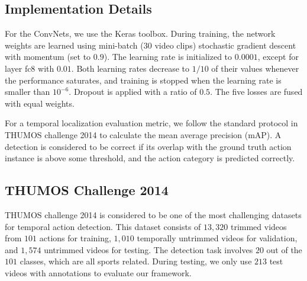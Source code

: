 \documentclass[10pt,twocolumn,letterpaper]{article}
\begin{document}
\subsection{Implementation Details}
For the ConvNets, we use the Keras toolbox.
During training, the network weights are learned using mini-batch ($30$ video clips) stochastic gradient descent with momentum (set to $0.9$). The learning rate is initialized to $0.0001$, except for layer \textsf{fc8} with $0.01$. Both learning rates decrease to $1/10$ of their values whenever the performance saturates, and training is stopped when the learning rate is smaller than $10^{-6}$. Dropout is applied with a ratio of $0.5$. The five losses are fused with equal weights.

For a temporal localization evaluation metric, we follow the standard protocol in THUMOS challenge 2014 to calculate the mean average precision (mAP). A detection is considered to be correct if its overlap with the ground truth action instance is above some threshold, and the action category is predicted correctly.

\subsection{THUMOS Challenge 2014}
THUMOS challenge 2014 is considered to be one of the most challenging datasets for temporal action detection. This dataset consists of $13,320$ trimmed videos from $101$ actions for training, $1,010$ temporally untrimmed videos for validation, and $1,574$ untrimmed videos for testing. The detection task involves $20$ out of the $101$ classes, which are all sports related. During testing, we only use $213$ test videos with annotations to evaluate our framework.
\end{document}
